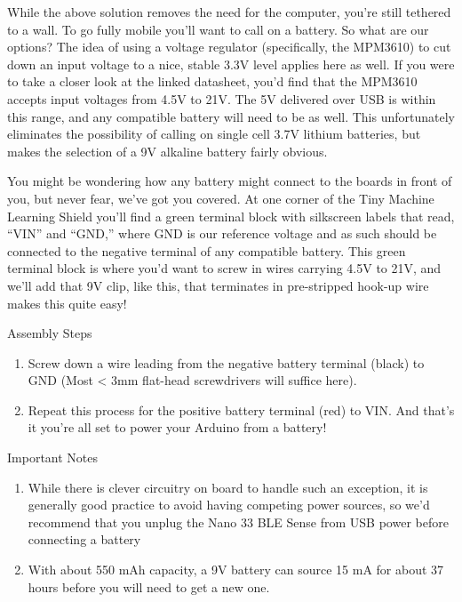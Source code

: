 While the above solution removes the need for the computer, you’re still tethered to a wall. To go fully mobile you’ll want to call on a battery. So what are our options? The idea of using a voltage regulator (specifically, the MPM3610) to cut down an input voltage to a nice, stable 3.3V level applies here as well. If you were to take a closer look at the linked datasheet, you’d find that the MPM3610 accepts input voltages from 4.5V to 21V. The 5V delivered over USB is within this range, and any compatible battery will need to be as well. This unfortunately eliminates the possibility of calling on single cell 3.7V lithium batteries, but makes the selection of a 9V alkaline battery fairly obvious.
    
    You might be wondering how any battery might connect to the boards in front of you, but never fear, we’ve got you covered. At one corner of the Tiny Machine Learning Shield you’ll find a green terminal block with silkscreen labels that read, “VIN” and “GND,” where GND is our reference voltage and as such should be connected to the negative terminal of any compatible battery. This green terminal block is where you’d want to screw in wires carrying 4.5V to 21V, and we’ll add that 9V clip, like this, that terminates in pre-stripped hook-up wire makes this quite easy!

\bigskip
    
    Assembly Steps

\begin{enumerate}
  \item Screw down a wire leading from the negative battery terminal (black) to GND (Most < 3mm flat-head screwdrivers will suffice here).
  \item Repeat this process for the positive battery terminal (red) to VIN. And that's it you're all set to power your Arduino from a battery!
\end{enumerate}


\bigskip

Important Notes
    
\begin{enumerate}
  \item While there is clever circuitry on board to handle such an exception, it is generally good practice to avoid having competing power sources, so we’d recommend that you unplug the Nano 33 BLE Sense from USB power before connecting a battery
    
  \item With about 550 mAh capacity, a 9V battery can source 15 mA for about 37 hours before you will need to get a new one.
\end{enumerate}
    
